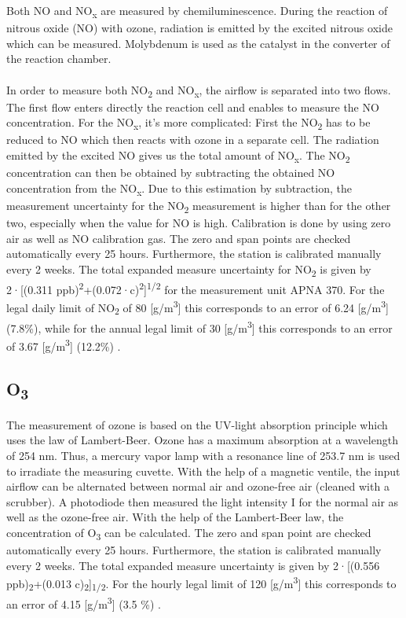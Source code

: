 \documentclass[a4paper, 12pt]{article}
\begin{document}
        Both NO and NO\textsubscript{x} are measured by chemiluminescence. During the reaction of nitrous oxide (NO) with ozone, radiation is emitted by the excited nitrous oxide which can be measured. Molybdenum is used as the catalyst in the converter of the reaction chamber. 
        \\
        \\
        In order to measure both NO\textsubscript{2} and NO\textsubscript{x}, the airflow is separated into two flows. The first flow enters directly the reaction cell and enables to measure the NO concentration. For the NO\textsubscript{x}, it’s more complicated: First the NO\textsubscript{2} has to be reduced to NO which then reacts with ozone in a separate cell. The radiation emitted by the excited NO gives us the total amount of NO\textsubscript{x}. The NO\textsubscript{2} concentration can then be obtained by subtracting the obtained NO concentration from the NO\textsubscript{x}. Due to this estimation by subtraction, the measurement uncertainty for the NO\textsubscript{2} measurement is higher than for the other two, especially when the value for NO is high. Calibration is done by using zero air as well as NO calibration gas. The zero and span points are checked automatically every 25 hours. Furthermore, the station is calibrated manually every 2 weeks. The total expanded measure uncertainty for NO\textsubscript{2} is given by 2·[(0.311 ppb)\textsuperscript{2}+(0.072·c)\textsuperscript{2}]\textsuperscript{1/2} for the measurement unit APNA 370. For the legal daily limit of NO\textsubscript{2} of 80 [\textmu g/m\textsuperscript{3}] this corresponds to an error of 6.24 [\textmu g/m\textsuperscript{3}] (7.8\%), while for the annual legal limit of 30 [\textmu g/m\textsuperscript{3}] this corresponds to an error of 3.67 [\textmu g/m\textsuperscript{3}] (12.2\%) \cite{NABEL}.	

    \subsection{O\textsubscript{3}}
        The measurement of ozone is based on the UV-light absorption principle which uses the law of Lambert-Beer. Ozone has a maximum absorption at a wavelength of 254 nm. Thus, a mercury vapor lamp with a resonance line of 253.7 nm is used to irradiate the measuring cuvette. With the help of a magnetic ventile, the input airflow can be alternated between normal air and ozone-free air (cleaned with a scrubber). A photodiode then measured the light intensity I for the normal air as well as the ozone-free air. With the help of the Lambert-Beer law, the concentration of O\textsubscript{3} can be calculated. The zero and span point are checked automatically every 25 hours. Furthermore, the station is calibrated manually every 2 weeks. The total expanded measure uncertainty is given by 2·[(0.556 ppb)\textsubscript{2}+(0.013 c)\textsubscript{2}]\textsubscript{1/2}. For the hourly legal limit of 120 [\textmu g/m\textsuperscript{3}] this corresponds to an error of 4.15 [\textmu g/m\textsuperscript{3}] (3.5 \%) \cite{NABEL}. 
		
\end{document}
